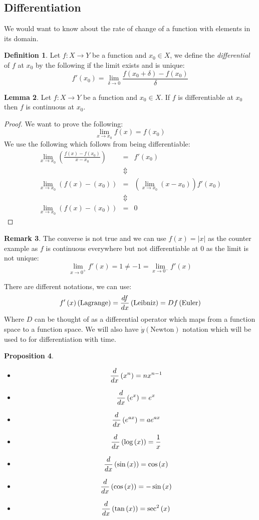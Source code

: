 \documentclass[11pt]{article}
\theoremstyle{definition}
\newtheorem{prop}{Proposition}[section]
\newtheorem{lemma}[prop]{Lemma}
\newtheorem{rmk}[prop]{Remark}
\newtheorem{defn}[prop]{Definition}
\newcommand{\brac}[1]{\left(#1\right)}
\newcommand{\diff}[2]{\frac{d\ifthenelse{\equal{#1}{}}{}{#1}}{d#2}}
\newcommand{\abs}[1]{\left\lvert#1\right\rvert}
\begin{document}
\subsection{Differentiation}
	We would want to know about the rate of change of a function with elements in its domain.
	\begin{defn}
		Let $f:X\rightarrow Y$ be a function and $x_0 \in X$, we define the \emph{differential} of $f$ at $x_0$ by the following if the limit exists and is unique:
		$$ f'\brac{x_0} = \lim_{\delta\rightarrow 0}\frac{f\brac{x_0 + \delta}-f\brac{x_0}}{\delta}$$
	\end{defn}
	\begin{lemma}
		Let $f:X\rightarrow Y$ be a function and $x_0\in X$. If $f$ is differentiable at $x_0$ then $f$ is continuous at $x_0$.
	\end{lemma}
	\begin{proof}
		We want to prove the following:
		$$\lim_{x\rightarrow x_0} f\brac{x} = f\brac{x_0}$$
		We use the following which follows from being differentiable:
		\begin{eqnarray*}
			\lim_{x\rightarrow x_0} \brac{\frac{f\brac{x}-f\brac{x_0}}{x-x_0}} &=& f'\brac{x_0}\\
			&\Updownarrow&\\
			\lim_{x\rightarrow x_0} \brac{f\brac{x}-\brac{x_0}} &=& \brac{\lim_{x\rightarrow x_0} \brac{x- x_0}}f'\brac{x_0}\\
			&\Updownarrow&\\
			\lim_{x\rightarrow x_0} \brac{f\brac{x}-\brac{x_0}} &=& 0
		\end{eqnarray*}
	\end{proof}
	\begin{rmk}
		The converse is not true and we can use $f\brac{x} = \abs{x}$ as the counter example as $f$ is continuous everywhere but not differentiable at 0 as the limit is not unique:
		$$\lim_{x\rightarrow 0^+} f'\brac{x} = 1 \neq -1 = \lim_{x\rightarrow 0^-} f'\brac{x}$$
	\end{rmk}
	There are different notations, we can use:
	$$ f'\brac{x} \brac{\text{Lagrange}} = \diff{f}{x} \brac{\text{Leibniz}} = Df \brac{\text{Euler}}$$
	Where $D$ can be thought of as a differential operator which maps from a function space to a function space. We will also have $\dot{y} \brac{\text{Newton}}$ notation which will be used to for differentiation with time.
	\begin{prop}
		\begin{itemize}
			\item $$\diff{}{x}\brac{x^n} = nx^{n-1}$$
			\item $$\diff{}{x}\brac{e^x} = e^x$$
			\item $$\diff{}{x}\brac{e^{ax}} = ae^{ax}$$
			\item $$\diff{}{x}\brac{\log\brac{x}} = \frac{1}{x}$$
			\item $$\diff{}{x}\brac{\sin\brac{x}} = \cos\brac{x}$$
			\item $$\diff{}{x}\brac{\cos\brac{x}} = -\sin\brac{x}$$
			\item $$\diff{}{x}\brac{\tan\brac{x}} = \sec^2\brac{x}$$
		\end{itemize}
	\end{prop}
\end{document}
